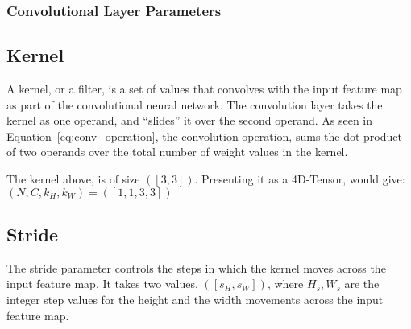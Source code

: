 \subsubsection{Convolutional Layer Parameters}
\subsection*{Kernel}
A kernel, or a filter, is a set of values that convolves with 
the input feature map
as part of the convolutional neural network. 
The convolution layer takes the kernel as one operand,
and ``slides'' it over the second operand. 
As seen in Equation~\ref{eq:conv_operation}, 
the convolution operation, sums the dot product of two operands
over the total number of weight values in the kernel. 

\begin{figure}[H]
    \centering
\end{figure}

The kernel above, is of size \( \left( \left[ 3, 3 \right] \right) \).
Presenting it as a 4D-Tensor, would give: \( \left( N, C, k_{H}, k_{W} \right)  = \left( \left[ 1, 1, 3, 3 \right] \right)  \)

\subsection*{Stride}
The stride parameter controls the steps in which the kernel 
moves across the input feature map. 
It takes two values, \( \left( \left[ s_{H}, s_{W} \right] \right) \), 
where \( H_{s}, W_{s} \) are the integer step values for the 
height and the width movements across the input feature map.

